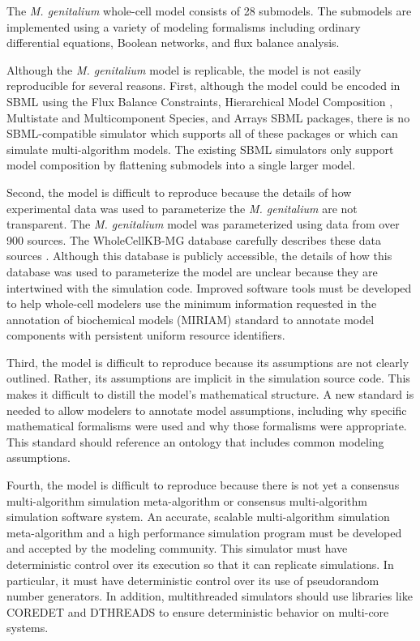 \documentclass[journal,transmag,twoside]{IEEEtran}
\begin{document}
The \textit{M. genitalium} whole-cell model \cite{Karr2012} consists of 28 submodels.
The submodels are implemented using a variety of modeling formalisms including
ordinary differential equations, Boolean networks, and flux balance analysis.

Although the \textit{M. genitalium} model is replicable, the model is not easily reproducible for several reasons. First,
although the model could be encoded in SBML using the Flux Balance Constraints, Hierarchical Model Composition \cite{smith2015sbml}, Multistate and Multicomponent
Species, and Arrays \cite{watanabe2016efficient} SBML packages, there is no SBML-compatible simulator which supports all of these packages or
which can simulate multi-algorithm models. The existing SBML simulators only support 
model composition by flattening submodels into a single larger model. 

Second, the model is difficult to reproduce because the details of how experimental data was used to parameterize the \textit{M. genitalium}
are not transparent. The \textit{M. genitalium} model was parameterized using data from over 900 
sources. The WholeCellKB-MG database carefully describes these data sources \cite{karr2013wholecellkb}. Although this database is publicly accessible, 
the details of how this database was used to parameterize the model are unclear
because they are intertwined with the simulation code. 
Improved software tools must be developed to help whole-cell modelers use the minimum information 
requested in the annotation of biochemical models (MIRIAM) \cite{novere2005minimum}
standard to annotate model components with persistent uniform resource identifiers. 

Third, the model is difficult to reproduce because its assumptions are not clearly outlined. Rather, its assumptions are
implicit in the simulation source code. This makes it difficult
to distill the model's mathematical structure. A new standard is needed to allow modelers to annotate model assumptions, including why
specific mathematical formalisms were used and why those formalisms were appropriate. This standard should reference an ontology that 
includes common modeling assumptions.

Fourth, the model is difficult to reproduce because there is not yet a consensus multi-algorithm simulation meta-algorithm 
or consensus multi-algorithm simulation software system. An accurate, scalable multi-algorithm simulation meta-algorithm
and a high performance simulation program must be developed and accepted by the modeling community. This 
simulator must have deterministic control over its execution so that it can replicate 
simulations. In particular, it must have deterministic control over its use of pseudorandom number generators. 
In addition, multithreaded simulators should use libraries like C{\small ORE}D{\small ET} and D{\small THREADS} to 
ensure deterministic behavior on multi-core systems.
\end{document}
